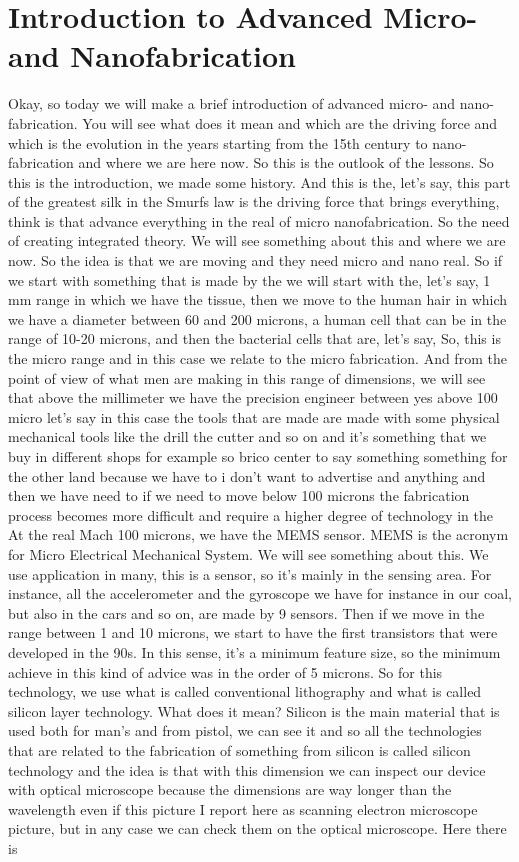 \chapter{Introduction to Advanced Micro- and Nanofabrication}
Okay, so today we will make a brief introduction of advanced micro- and nano-fabrication. You will see what does it mean and which are the driving force and which is the evolution in the years starting from the 15th century to nano-fabrication and where we are here now. So this is the outlook of the lessons. So this is the introduction, we made some history. And this is the, let's say, this part of the greatest silk in the Smurfs law is the driving force that brings everything, think is that advance everything in the real of micro nanofabrication. So the need of creating integrated theory. We will see something about this and where we are now. So the idea is that we are moving and they need micro and nano real. So if we start with something that is made by the we will start with the, let's say, 1 mm range in which we have the tissue, then we move to the human hair in which we have a diameter between 60 and 200 microns, a human cell that can be in the range of 10-20 microns, and then the bacterial cells that are, let's say, So, this is the micro range and in this case we relate to the micro fabrication. And from the point of view of what men are making in this range of dimensions, we will see that above the millimeter we have the precision engineer between yes above 100 micro let's say in this case the tools that are made are made with some physical mechanical tools like the drill the cutter and so on and it's something that we buy in different shops for example so brico center to say something something for the other land because we have to i don't want to advertise and anything and then we have need to if we need to move below 100 microns the fabrication process becomes more difficult and require a higher degree of technology in the At the real Mach 100 microns, we have the MEMS sensor. MEMS is the acronym for Micro Electrical Mechanical System. We will see something about this. We use application in many, this is a sensor, so it's mainly in the sensing area. For instance, all the accelerometer and the gyroscope we have for instance in our coal, but also in the cars and so on, are made by 9 sensors. Then if we move in the range between 1 and 10 microns, we start to have the first transistors that were developed in the 90s. In this sense, it's a minimum feature size, so the minimum achieve in this kind of advice was in the order of 5 microns. So for this technology, we use what is called conventional lithography and what is called silicon layer technology. What does it mean? Silicon is the main material that is used both for man's and from pistol, we can see it and so all the technologies that are related to the fabrication of something from silicon is called silicon technology and the idea is that with this dimension we can inspect our device with optical microscope because the dimensions are way longer than the wavelength even if this picture I report here as scanning electron microscope picture, but in any case we can check them on the optical microscope. Here there is 